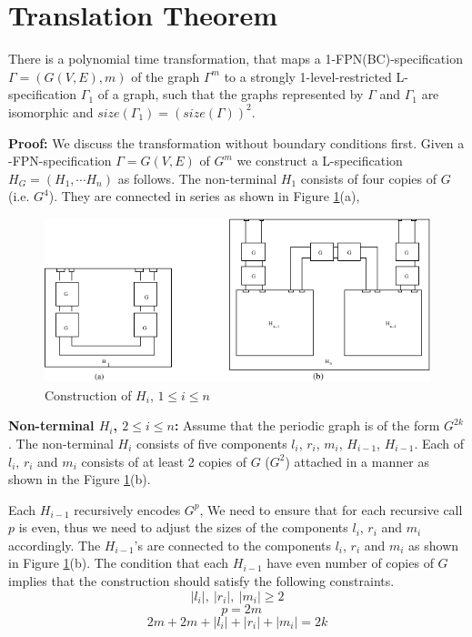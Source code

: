 \section{Translation Theorem}\label{sec:translation}


\begin{theorem}\label{th:translate}
There is a polynomial time transformation, that maps a 
1-FPN(BC)-specification $\Gamma = (G(V,E), m)$ of the  graph $\Gamma^m$ 
to a strongly 1-level-restricted 
L-specification $\Gamma_1$ of a graph, 
such that the graphs represented by 
$\Gamma$ and $\Gamma_1$ are isomorphic and 
$size(\Gamma_1) = (size(\Gamma))^2$.
\end{theorem}

\noindent
{\bf Proof:} We discuss the transformation without boundary conditions first.
Given a {-FPN}-specification  $\Gamma = G(V,E)$ of $G^m$ 
we construct a {\sf L}-specification $H_G = (H_1, \cdots H_n)$ as follows. 
The non-terminal $H_1$  consists of four copies of $G$ (i.e. $G^4$). 
They are connected in series as shown in Figure \ref{translation1.fig}(a), 

\begin{figure}[tbh]
\centering
\includegraphics{translation1}
\caption{Construction of $H_i$, $1 \leq i \leq n$}
\label{translation1.fig}
\end{figure}




\noindent 
{\bf Non-terminal  $H_i$, $2 \leq i \leq n$:}
Assume that the periodic graph is of the form $G^{2k}$.
The non-terminal $H_i$ consists of five components
$l_i$, $r_i$, $m_i$, $H_{i-1}$, $H_{i-1}$. 
Each of $l_i$, $r_i$ and  $m_i$ consists of at least 2 copies of $G$ 
($G^2$) attached in a manner as shown in the Figure \ref{translation1.fig}(b). 

Each $H_{i-1}$ recursively encodes $G^{p}$, 
We need to ensure that for each recursive
call $p$ is even, thus we need to adjust the sizes of 
the components $l_i$, $r_i$ and  $m_i$ accordingly.
The $H_{i-1}$'s 
are connected to the components $l_i$, $r_i$ and  $m_i$ as shown in 
Figure \ref{translation1.fig}(b). 
The condition that each $H_{i-1}$ have even number of copies of $G$ 
implies that the construction should satisfy the following constraints.
\[ |l_i|, ~ |r_i|, ~  |m_i| \geq 2 \]  
\[~~~ p = 2m \] 
\[2m + 2m + |l_i| + |r_i| +  |m_i| = 2k \]  


